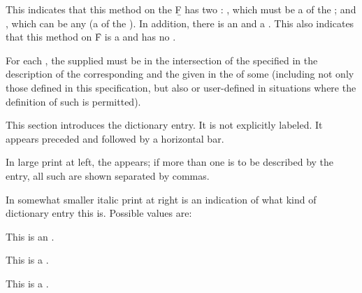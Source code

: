 {
	      {\opt}  {\key} }

\noindent This  indicates that this method on the 
\b{F} has two :
     , which must be a  of the  ;
 and , which can  be any  
       (\ie a  of the  ).
In addition, there is an   and a
 .  This  also indicates that this
method on \f{F} is a  and has no .

For each , the  supplied must be in the
intersection of the  specified in the description of the
corresponding  and the  given in 
the  of some  (including not only those 
 defined in this specification, but also
 or user-defined  in situations
where the definition of such  is permitted).

\endsubsubsection%


This section introduces the dictionary entry.  It is not explicitly labeled.
It appears preceded and followed by a horizontal bar.

In large print at left, the  appears; if more than one
 is to be described by the entry, all such  
are shown separated by commas.

In somewhat smaller italic print at right is an indication of what kind
of dictionary entry this is.  Possible values are:

\beginlist


This is an  .


This is a .


This is a .

